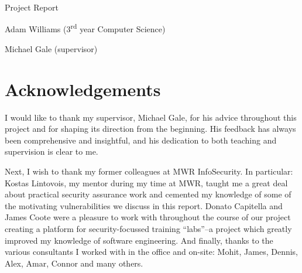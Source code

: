 \documentclass[a4paper,openany,12pt]{book}
\begin{document}
\begin{titlepage}
{}
    
    {\par}
    \vspace{1.25cm}
    \vspace{3.5cm}
    {\hspace{0.75cm}\Huge \warwickfont Project Report}
    \vspace{0.16cm}
    {\par}
    {\hspace{0.75cm}\large \warwickfont Adam Williams (3\textsuperscript{rd} year Computer Science)}


    {\hspace{0.75cm}\large \warwickfont Michael Gale (supervisor)}
    \vfill
\end{titlepage}
\restoregeometry
\restorepagecolor

\tableofcontents
\pagebreak[5]
\vspace{2em}
\section*{Acknowledgements}

I would like to thank my supervisor, Michael Gale, for his advice throughout this project and for shaping its
direction from the beginning. His feedback has always been comprehensive and insightful, and his dedication to
both teaching and supervision is clear to me.

Next, I wish to thank my former colleagues at MWR InfoSecurity. In particular: Kostas Lintovois, my mentor during
my time at MWR, taught me a great deal about practical security assurance work and cemented my knowledge of some of the
motivating vulnerabilities we discuss in this report. Donato Capitella and James Coote were a pleasure to work with
throughout the course of our project creating a platform for security-focussed training ``labs''--a project which
greatly improved my knowledge of software engineering.
And finally, thanks to the various consultants I worked with in the office and on-site: Mohit, James, Dennis, Alex, Amar,
Connor and many others.
\end{document}
